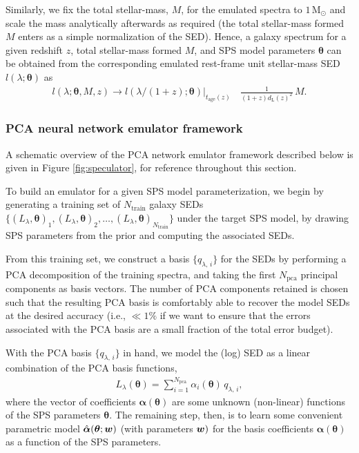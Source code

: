 \documentclass[twocolumn]{aastex62}
\newcommand{\vect}[1] {\mbox{\boldmath ${#1}$}}
\def\btheta{\boldsymbol{\theta}}
\begin{document}
Similarly, we fix the total stellar-mass, $M$, for the emulated spectra to $1\,\mathrm{M}_\odot$ and scale the mass analytically afterwards as required (the total stellar-mass formed $M$ enters as a simple normalization of the SED). Hence, a galaxy spectrum for a given redshift $z$, total stellar-mass formed $M$, and SPS model parameters $\btheta$ can be obtained from the corresponding emulated rest-frame unit stellar-mass SED $l(\lambda ; \btheta)$ as
%
\begin{align}
\label{redshift}
    l(\lambda;\btheta, M, z) \rightarrow  l(\lambda/(1+z);\btheta)\vert_{t_\mathrm{age}(z)}&\, \frac{1}{(1+z)d_\mathrm{L}(z)^2}\, M.
\end{align}
%
\subsubsection{PCA neural network emulator framework}
%
A schematic overview of the PCA network emulator framework described below is given in Figure \ref{fig:speculator}, for reference throughout this section.

To build an emulator for a given SPS model parameterization, we begin by generating a training set of $N_\mathrm{train}$ galaxy SEDs $\{(L_\lambda, \btheta)_1, (L_\lambda, \btheta)_2, \dots, (L_\lambda, \btheta)_{N_\mathrm{train}}\}$ under the target SPS model, by drawing SPS parameters from the prior and computing the associated SEDs. 

From this training set, we construct a basis $\{q_{\lambda,\,i}\}$ for the SEDs by performing a PCA decomposition of the training spectra, and taking the first $N_\mathrm{pca}$ principal components as basis vectors. The number of PCA components retained is chosen such that the resulting PCA basis is comfortably able to recover the model SEDs at the desired accuracy (i.e., $\ll 1\%$ if we want to ensure that the errors associated with the PCA basis are a small fraction of the total error budget).

With the PCA basis $\{q_{\lambda,\,i}\}$ in hand, we model the (log) SED as a linear combination of the PCA basis functions,
\begin{align}
    L_\lambda(\btheta) = \sum_{i=1}^{N_\mathrm{pca}}\alpha_i(\btheta)\,q_{\lambda,\,i},
\end{align}
where the vector of coefficients $\boldsymbol{\alpha}(\btheta)$ are some unknown (non-linear) functions of the SPS parameters $\btheta$. The remaining step, then, is to learn some convenient parametric model $\hat{\boldsymbol\alpha}(\btheta;\vect{w})$ (with parameters $\vect{w})$ for the basis coefficients $\boldsymbol{\alpha}(\btheta)$ as a function of the SPS parameters. 
\end{document}
